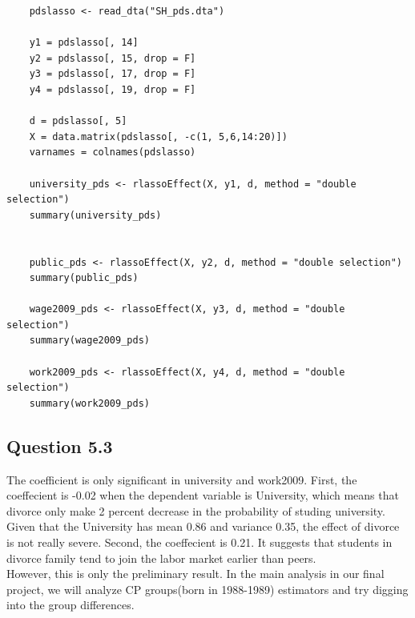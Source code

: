 \documentclass[11pt, letterpaper]{article}
\begin{document}
\begin{lstlisting}
    pdslasso <- read_dta("SH_pds.dta")

    y1 = pdslasso[, 14]
    y2 = pdslasso[, 15, drop = F]
    y3 = pdslasso[, 17, drop = F]
    y4 = pdslasso[, 19, drop = F]
    
    d = pdslasso[, 5]
    X = data.matrix(pdslasso[, -c(1, 5,6,14:20)])
    varnames = colnames(pdslasso)
    
    university_pds <- rlassoEffect(X, y1, d, method = "double selection")
    summary(university_pds)
    
    
    public_pds <- rlassoEffect(X, y2, d, method = "double selection")
    summary(public_pds)
    
    wage2009_pds <- rlassoEffect(X, y3, d, method = "double selection")
    summary(wage2009_pds)
    
    work2009_pds <- rlassoEffect(X, y4, d, method = "double selection")
    summary(work2009_pds)

\end{lstlisting}

\subsection*{Question 5.3}

The coefficient is only significant in university and work2009.
First, the coeffecient is -0.02 when the dependent variable is University, which means that divorce only make 2 percent decrease in the probability of studing university.
Given that the University has mean 0.86 and variance 0.35, the effect of divorce is not really severe. 
Second, the coeffecient is 0.21. It suggests that students in divorce family tend to join the labor market earlier than peers. \\

However, this is only the preliminary result.
In the main analysis in our final project, we will analyze CP groups(born in 1988-1989) estimators and try digging into the group differences. 
\end{document}
